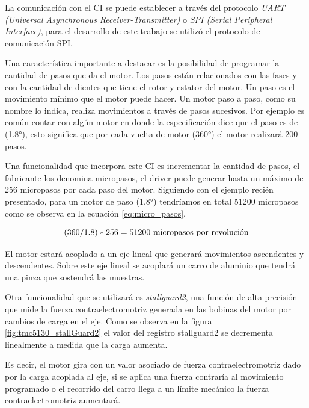 
La comunicación con el CI se puede establecer a través del protocolo \textit{ UART (Universal Asynchronous Receiver-Transmitter)} o \textit{SPI (Serial Peripheral Interface)}, para el desarrollo de este trabajo se utilizó el protocolo de comunicación SPI.


Una característica importante a destacar es la posibilidad de programar la cantidad de pasos que da el motor. Los pasos están relacionados con las fases  y con la cantidad de dientes que tiene el rotor y estator del motor. Un paso es el movimiento mínimo que el motor puede hacer. Un motor paso a paso, como su nombre lo indica, realiza movimientos a través de pasos sucesivos. Por ejemplo es común contar con algún motor en donde la especificación dice que el paso es de (\ang{1.8}), esto significa que por cada vuelta de motor (\ang{360}) el motor realizará 200 pasos.

Una funcionalidad que incorpora este CI es incrementar la cantidad de pasos, el fabricante los denomina micropasos, el driver puede generar hasta un máximo de 256 micropasos por cada paso del motor. Siguiendo con el ejemplo recién presentado, para un motor de paso (\ang{1.8}) tendríamos en total 51200 micropasos como se observa en la ecuación \ref{eq:micro_pasos}.

\begin{equation}
	\label{eq:micro_pasos}
		(360/1.8) * 256 = 51200 \textup{ micropasos por revolución}
\end{equation}

El motor estará acoplado a un eje lineal que generará movimientos ascendentes y descendentes. Sobre este eje lineal se acoplará un carro de aluminio que tendrá una pinza que sostendrá las muestras. 

Otra funcionalidad que se utilizará es \textit{stallguard2}, una función de alta precisión que mide la fuerza contraelectromotriz generada en las bobinas del motor por cambios de carga en el eje. Como se observa en la figura \ref{fig:tmc5130_stallGuard2} el valor del registro stallguard2 se decrementa linealmente a medida que la carga aumenta.

Es decir, el motor gira con un valor asociado de fuerza contraelectromotriz dado por la carga acoplada al eje, si se aplica una fuerza contraría al movimiento programado o el recorrido del carro llega a un límite mecánico la fuerza contraelectromotriz aumentará. 

